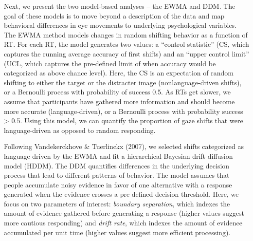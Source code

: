 \documentclass[10pt, letterpaper]{article}
\begin{document}
Next, we present the two model-based analyses -- the EWMA and DDM. The
goal of these models is to move beyond a description of the data and map
behavioral differences in eye movements to underlying psychological
variables. The EWMA method models changes in random shifting behavior as
a function of RT. For each RT, the model generates two values: a
``control statistic'' (CS, which captures the running average accuracy
of first shifts) and an ``upper control limit'' (UCL, which captures the
pre-defined limit of when accuracy would be categorized as above chance
level). Here, the CS is an expectation of random shifting to either the
target or the distracter image (nonlanguage-driven shifts), or a
Bernoulli process with probability of success 0.5. As RTs get slower, we
assume that participants have gathered more information and should
become more accurate (language-driven), or a Bernoulli process with
probability success \textgreater{} 0.5. Using this model, we can
quantify the proportion of gaze shifts that were language-driven as
opposed to random responding.

Following Vandekerckhove \& Tuerlinckx (2007), we selected shifts
categorized as language-driven by the EWMA and fit a hierarchical
Bayesian drift-diffusion model (HDDM). The DDM quantifies differences in
the underlying decision process that lead to different patterns of
behavior. The model assumes that people accumulate noisy evidence in
favor of one alternative with a response generated when the evidence
crosses a pre-defined decision threshold. Here, we focus on two
parameters of interest: \emph{boundary separation}, which indexes the
amount of evidence gathered before generating a response (higher values
suggest more cautious responding) and \emph{drift rate}, which indexes
the amount of evidence accumulated per unit time (higher values suggest
more efficient processing).
\end{document}
